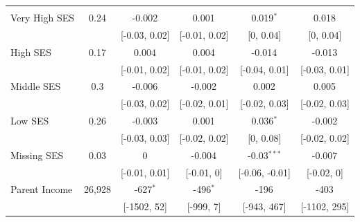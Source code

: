 \begin{table}[!htp]
{{\begin{threeparttable}
\begin{tabular}[t]{lccccc}
\addlinespace[0.3em]
\multicolumn{6}{l}{\textit{Parent SES}}\\
\hspace{1em}\hspace{1em}Very High SES & 0.24 & -0.002$^{}$ & 0.001$^{}$ & 0.019$^{*}$ & 0.018$^{}$\\
\hspace{1em}\hspace{1em} &  & {}[-0.03, 0.02] & {}[-0.01, 0.02] & {}[0, 0.04] & {}[0, 0.04]\\
\hspace{1em}\hspace{1em}High SES & 0.17 & 0.004$^{}$ & 0.004$^{}$ & -0.014$^{}$ & -0.013$^{}$\\
\hspace{1em}\hspace{1em} &  & {}[-0.01, 0.02] & {}[-0.01, 0.02] & {}[-0.04, 0.01] & {}[-0.03, 0.01]\\
\hspace{1em}\hspace{1em}Middle SES & 0.3 & -0.006$^{}$ & -0.002$^{}$ & 0.002$^{}$ & 0.005$^{}$\\
\hspace{1em}\hspace{1em} &  & {}[-0.03, 0.02] & {}[-0.02, 0.01] & {}[-0.02, 0.03] & {}[-0.02, 0.03]\\
\hspace{1em}\hspace{1em}Low SES & 0.26 & -0.003$^{}$ & 0.001$^{}$ & 0.036$^{*}$ & -0.002$^{}$\\
\hspace{1em}\hspace{1em} &  & {}[-0.03, 0.03] & {}[-0.02, 0.02] & {}[0, 0.08] & {}[-0.02, 0.02]\\
\hspace{1em}\hspace{1em}Missing SES & 0.03 & 0$^{}$ & -0.004$^{}$ & -0.03$^{***}$ & -0.007$^{}$\\
\hspace{1em}\hspace{1em} &  & {}[-0.01, 0.01] & {}[-0.01, 0] & {}[-0.06, -0.01] & {}[-0.02, 0]\\
\hspace{1em}\hspace{1em}Parent Income & 26,928 & -627$^{*}$ & -496$^{*}$ & -196$^{}$ & -403$^{}$\\
\hspace{1em}\hspace{1em} &  & {}[-1502, 52] & {}[-999, 7] & {}[-943, 467] & {}[-1102, 295]\\

\end{tabular}
\end{threeparttable}}}
\end{table}

